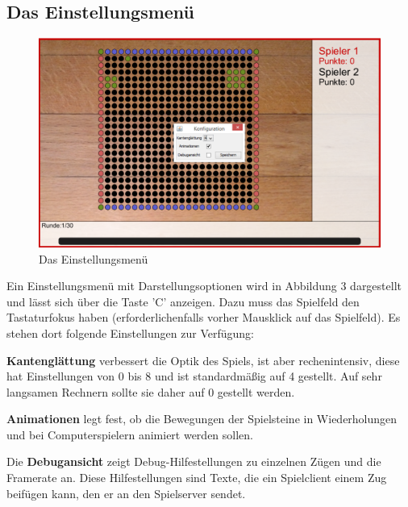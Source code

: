 \documentclass[a4paper, ngerman]{scrartcl}
\begin{document}
\subsection{Das Einstellungsmenü}

\begin{figure}[h!]
  \centering
  \includegraphics[scale=0.6]{bilder/konfiguration.png}
  \caption{Das Einstellungsmenü}
  \label{fig:Configuration}
\end{figure}

Ein Einstellungsmenü mit Darstellungsoptionen wird in Abbildung 3
dargestellt und lässt sich über die Taste 'C' anzeigen. Dazu muss das
Spielfeld den Tastaturfokus haben (erforderlichenfalls vorher
Mausklick auf das Spielfeld). Es stehen dort folgende Einstellungen
zur Verfügung:

\textbf{Kantenglättung} verbessert die Optik des Spiels, ist aber
rechenintensiv, diese hat Einstellungen von 0 bis 8 und ist
standardmäßig auf 4 gestellt.  Auf sehr langsamen Rechnern sollte sie
daher auf 0 gestellt werden.

\textbf{Animationen} legt fest, ob die Bewegungen der Spielsteine in
Wiederholungen und bei Computerspielern animiert werden sollen.

Die \textbf{Debugansicht} zeigt Debug-Hilfestellungen zu einzelnen
Zügen und die Framerate an.  Diese Hilfestellungen sind Texte, die ein
Spielclient einem Zug beifügen kann, den er an den Spielserver sendet.
\end{document}
